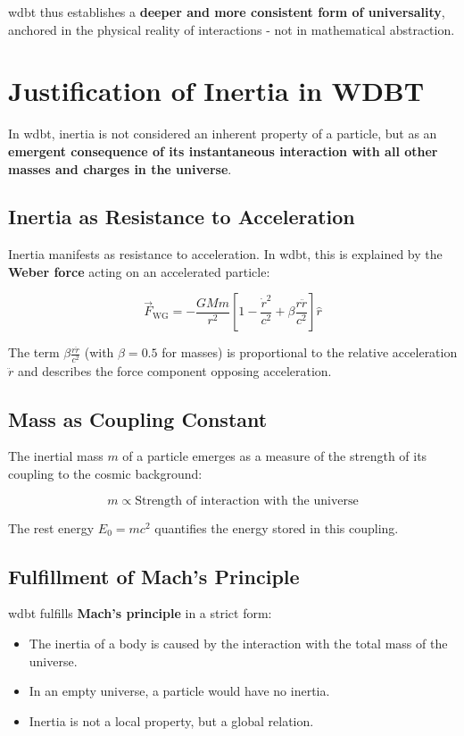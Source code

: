 \gls{wdbt} thus establishes a \textbf{deeper and more consistent form of universality}, anchored in the physical reality of interactions - not in mathematical abstraction.

\section{Justification of Inertia in WDBT}

In \gls{wdbt}, inertia is not considered an inherent property of a particle, but as an \textbf{emergent consequence of its instantaneous interaction with all other masses and charges in the universe}.

\subsection{Inertia as Resistance to Acceleration}
Inertia manifests as resistance to acceleration. In \gls{wdbt}, this is explained by the \textbf{Weber force} acting on an accelerated particle:

\[
\vec{F}_{\text{WG}} = -\frac{G M m}{r^2} \left[ 1 - \frac{\dot{r}^2}{c^2} + \beta \frac{r \ddot{r}}{c^2} \right] \hat{r}
\]

The term $\beta \frac{r \ddot{r}}{c^2}$ (with $\beta = 0.5$ for masses) is proportional to the relative acceleration $\ddot{r}$ and describes the force component opposing acceleration.

\subsection{Mass as Coupling Constant}
The inertial mass $m$ of a particle emerges as a measure of the strength of its coupling to the cosmic background:

\[
m \propto \text{Strength of interaction with the universe}
\]

The rest energy $E_0 = m c^2$ quantifies the energy stored in this coupling.

\subsection{Fulfillment of Mach's Principle}
\gls{wdbt} fulfills \textbf{Mach's principle} in a strict form:
\begin{itemize}
    \item The inertia of a body is caused by the interaction with the total mass of the universe.
    \item In an empty universe, a particle would have no inertia.
    \item Inertia is not a local property, but a global relation.
\end{itemize}

